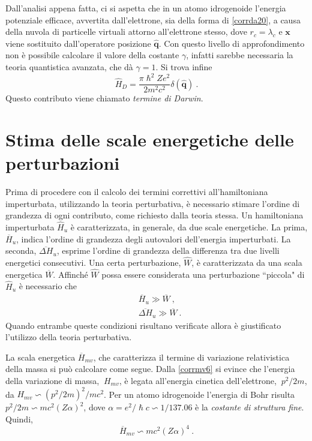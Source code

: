 \documentclass[12pt,a4paper]{report}
\numberwithin{equation}{section}
\numberwithin{section}{chapter}
\begin{document}
	Dall'analisi appena fatta, ci si aspetta che in un atomo idrogenoide l'energia potenziale efficace, avvertita dall'elettrone, sia della forma di \eqref{corrda20}, a causa della nuvola di particelle virtuali attorno all'elettrone stesso, dove $r_c = \lambda_c$ e $\boldsymbol{x}$ viene sostituito dall'operatore posizione $\widehat{\boldsymbol{q}}$. Con questo livello di approfondimento non \`e possibile calcolare il valore della costante $\gamma$, infatti sarebbe necessaria la teoria quantistica avanzata, che d\`a $\gamma = 1$. Si trova infine
	\begin{equation}
	\label{corrda21}
	\widehat{H}_D = \frac{\pi\hslash^2Ze^2}{2m^2c^2}\delta(\widehat{\boldsymbol{q}})~.
	\end{equation}
	Questo contributo viene chiamato \textit{termine di Darwin}.
	

	\chapter{Stima delle scale energetiche delle perturbazioni}\label{cha:scen}
	Prima di procedere con il calcolo dei termini correttivi all'hamiltoniana imperturbata, utilizzando la teoria perturbativa, \`e necessario stimare l'ordine di grandezza di ogni contributo, come richiesto dalla teoria stessa. Un hamiltoniana imperturbata $\widehat{H}_u$ \`e caratterizzata, in generale, da due scale energetiche. La prima, $\overline{H}_u$, indica l'ordine di grandezza degli autovalori dell'energia imperturbati. La seconda, $\overline{\Delta H}_u$, esprime l'ordine di grandezza della differenza tra due livelli energetici consecutivi. Una certa perturbazione, $\widehat{W}$, \`e caratterizzata da una scala energetica $\overline{W}$. Affinch\'e $\widehat{W}$ possa essere considerata una perturbazione ``piccola" di $\widehat{H}_u$ \`e necessario che
	\begin{subequations}
		\begin{align}
		&\overline{H}_u \gg \overline{W}~,\label{scen1:first}\\
		&\overline{\Delta H}_u \gg \overline{W}~.\label{scen1:second}
		\end{align}
	\end{subequations}
	Quando entrambe queste condizioni risultano verificate allora \`e giustificato l'utilizzo della teoria perturbativa.
	
	La scala energetica $\overline{H}_{mv}$, che caratterizza il termine di variazione relativistica della massa si pu\`o calcolare come segue. Dalla \eqref{corrmv6} si evince che l'energia della variazione di massa, $~H_{mv}$, \`e legata all'energia cinetica dell'elettrone, $~p^2/2m$, da $H_{mv} \backsim (p^2/2m)^2/mc^2$. Per un atomo idrogenoide l'energia di Bohr risulta $p^2/2m \backsim mc^2(Z\alpha)^2$, dove $\alpha = e^2/\hslash c \backsim 1/137.06$ \`e la \textit{costante di struttura fine}. Quindi,
	\begin{equation}
	\label{scen2}
	\overline{H}_{mv} \backsim mc^2(Z\alpha)^4~.
	\end{equation}
	
\end{document}
